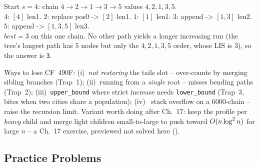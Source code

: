 \begin{tracebox}[Official Example~2: $n=5$, $r=(1,2,3,4,5)$, edges $1\text{--}2,1\text{--}3,2\text{--}4,3\text{--}5$ $\Rightarrow$ 3]
Start $s=4$: chain $4\!\to\!2\!\to\!1\!\to\!3\!\to\!5$ values $4,2,1,3,5$.\\
$4$: $[4]$ len1. $2$: replace pos0 -> $[2]$ len1. $1$: $[1]$ len1.
$3$: append -> $[1,3]$ len2. $5$: append -> $[1,3,5]$ len3.\\
$\mathit{best}=3$ on this one chain. No other path yields a longer increasing run
(the tree's longest path has $5$ nodes but only the $4,2,1,3,5$ order, whose LIS is
$3$), so the answer is \texttt{3}. \checkmark
\end{tracebox}


\begin{warningbox}
Ways to lose CF~490F: (i)~\emph{not restoring} the tails slot -- over-counts by
merging sibling branches (Trap~1); (ii)~running from a \emph{single} root -- misses
bending paths (Trap~2); (iii)~\lstinline{upper_bound} where strict increase needs
\lstinline{lower_bound} (Trap~3, bites when two cities share a population); (iv)~
stack overflow on a $6000$-chain \re -- raise the recursion limit. Variant worth
doing after Ch.~17: keep the profile per \emph{heavy} child and merge light children
small-to-large to push toward $O(n\log^2 n)$ for large $n$ -- a Ch.~17 exercise,
previewed not solved here ().
\end{warningbox}

\subsection{Practice Problems}

